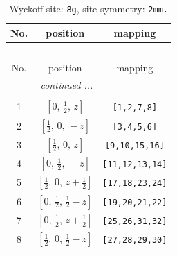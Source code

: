 \documentclass[fleqn,8pt]{jsarticle}
\begin{document}
\begin{longtable}{ccc}
\caption{Wyckoff site: {\tt 8g}, site symmetry: {\tt 2mm.}}
 \\
 \hline \hline
No. & position & mapping \\ \hline \endfirsthead

\multicolumn{2}{l}{\tablename\ \thetable{}} \\
 \hline \hline
No. & position & mapping \\ \hline \endhead

 \hline \hline
\multicolumn{2}{r}{\footnotesize\it continued ...} \\ \endfoot

 \hline \hline
\multicolumn{2}{r}{} \\ \endlastfoot

1 & $\left[ 0,\, \frac{1}{2},\, z \right]$ & {\tt [1,2,7,8]} \\ \hline
2 & $\left[ \frac{1}{2},\, 0,\, - z \right]$ & {\tt [3,4,5,6]} \\ \hline
3 & $\left[ \frac{1}{2},\, 0,\, z \right]$ & {\tt [9,10,15,16]} \\ \hline
4 & $\left[ 0,\, \frac{1}{2},\, - z \right]$ & {\tt [11,12,13,14]} \\ \hline
5 & $\left[ \frac{1}{2},\, 0,\, z + \frac{1}{2} \right]$ & {\tt [17,18,23,24]} \\ \hline
6 & $\left[ 0,\, \frac{1}{2},\, \frac{1}{2} - z \right]$ & {\tt [19,20,21,22]} \\ \hline
7 & $\left[ 0,\, \frac{1}{2},\, z + \frac{1}{2} \right]$ & {\tt [25,26,31,32]} \\ \hline
8 & $\left[ \frac{1}{2},\, 0,\, \frac{1}{2} - z \right]$ & {\tt [27,28,29,30]} \\
\end{longtable}
\renewcommand{\arraystretch}{1.2}
\end{document}
